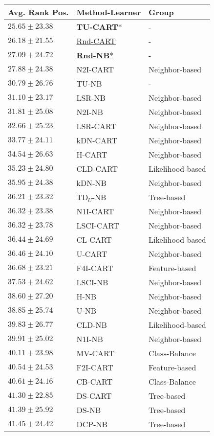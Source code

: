 \begin{tabular}{lll}
\toprule
Avg. Rank Pos. & Method-Learner & Group \\
\midrule
$25.65\pm23.38$ & \textbf{TU-CART}* & - \\
$26.18\pm21.55$ & \underline{Rnd-CART} & - \\
$27.09\pm24.72$ & \underline{\textbf{Rnd-NB}*} & - \\
$27.88\pm24.38$ & N2I-CART & Neighbor-based \\
$30.79\pm26.76$ & TU-NB & - \\
$31.10\pm23.17$ & LSR-NB & Neighbor-based \\
$31.81\pm25.08$ & N2I-NB & Neighbor-based \\
$32.66\pm25.23$ & LSR-CART & Neighbor-based \\
$33.77\pm24.11$ & kDN-CART & Neighbor-based \\
$34.54\pm26.63$ & H-CART & Neighbor-based \\
$35.23\pm24.80$ & CLD-CART & Likelihood-based \\
$35.95\pm24.38$ & kDN-NB & Neighbor-based \\
$36.21\pm23.32$ & TD$_U$-NB & Tree-based \\
$36.32\pm23.38$ & N1I-CART & Neighbor-based \\
$36.32\pm23.78$ & LSCI-CART & Neighbor-based \\
$36.44\pm24.69$ & CL-CART & Likelihood-based \\
$36.46\pm24.10$ & U-CART & Neighbor-based \\
$36.68\pm23.21$ & F4I-CART & Feature-based \\
$37.53\pm24.62$ & LSCI-NB & Neighbor-based \\
$38.60\pm27.20$ & H-NB & Neighbor-based \\
$38.85\pm25.74$ & U-NB & Neighbor-based \\
$39.83\pm26.77$ & CLD-NB & Likelihood-based \\
$39.91\pm25.02$ & N1I-NB & Neighbor-based \\
$40.11\pm23.98$ & MV-CART & Class-Balance \\
$40.54\pm24.53$ & F2I-CART & Feature-based \\
$40.61\pm24.16$ & CB-CART & Class-Balance \\
$41.30\pm22.85$ & DS-CART & Tree-based \\
$41.39\pm25.92$ & DS-NB & Tree-based \\
$41.45\pm24.42$ & DCP-NB & Tree-based \\

\end{tabular}
